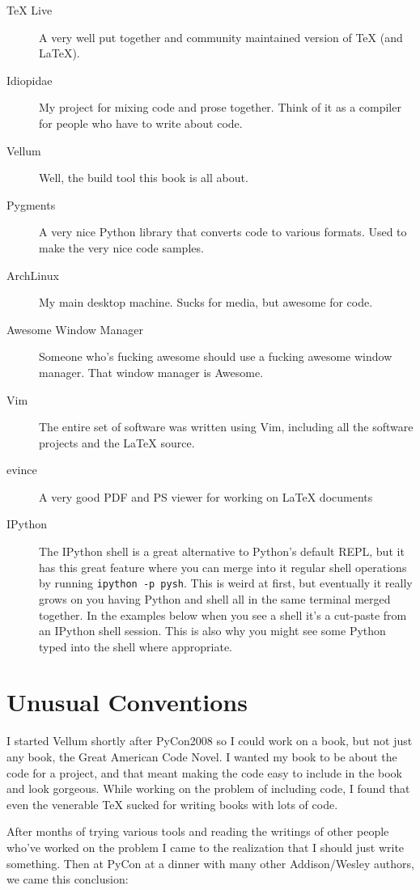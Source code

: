 \begin{description}
\item[TeX Live] A very well put together and community maintained version of TeX
(and LaTeX).
\item[Idiopidae] My project for mixing code and prose together.  Think of it as
a compiler for people who have to write about code.
\item[Vellum] Well, the build tool this book is all about.
\item[Pygments] A very nice Python library that converts code to various
formats.  Used to make the very nice code samples.
\item[ArchLinux] My main desktop machine.  Sucks for media, but awesome for
code.
\item[Awesome Window Manager] Someone who's fucking awesome should use a fucking awesome window
manager.  That window manager is Awesome.
\item[Vim] The entire set of software was written using Vim, including all the
software projects and the LaTeX source.
\item[evince] A very good PDF and PS viewer for working on LaTeX documents
\item[IPython] The IPython shell is a great alternative to Python's default
REPL, but it has this great feature where you can merge into it regular shell
operations by running \verb|ipython -p pysh|.  This is weird at first, but
eventually it really grows on you having Python and shell all in the same
terminal merged together.  In the examples below when you see a shell it's a
cut-paste from an IPython shell session.  This is also why you might see some
Python typed into the shell where appropriate.
\end{description}


\section*{Unusual Conventions}

I started Vellum shortly after PyCon2008 so I could work on a book, but not just
any book, the Great American Code Novel.  I wanted my book to be about the code
for a project, and that meant making the code easy to include in the book and
look gorgeous.  While working on the problem of including code, I found that
even the venerable TeX sucked for writing books with lots of code.

After months of trying various tools and reading the writings of other people
who've worked on the problem I came to the realization that I should just write
something.  Then at PyCon at a dinner with many other Addison/Wesley authors, we
came this conclusion:

